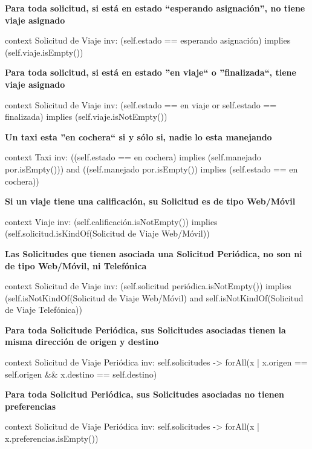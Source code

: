 \documentclass[a4paper, 10pt, twoside]{article}
\newenvironment{ocl}[1]
  {
    \textbf{#1}
    \verbatim
  }{
    \endverbatim
  }
\begin{document}
\begin{ocl}{Para toda solicitud, si está en estado ``esperando asignación'', no tiene viaje asignado}
  context Solicitud de Viaje
  inv: (self.estado == esperando asignación) implies
       (self.viaje.isEmpty()) 
\end{ocl}

\begin{ocl}{Para toda solicitud, si está en estado ''en viaje`` o ''finalizada``, tiene viaje asignado}
  context Solicitud de Viaje
  inv: (self.estado == en viaje or self.estado == finalizada) implies
       (self.viaje.isNotEmpty()) 
\end{ocl}

\begin{ocl}{Un taxi esta ''en cochera`` si y sólo si, nadie lo esta manejando}
  context Taxi
  inv: ((self.estado == en cochera) implies (self.manejado por.isEmpty())) and
       ((self.manejado por.isEmpty()) implies (self.estado == en cochera))
\end{ocl}
 
\begin{ocl}{Si un viaje tiene una calificación, su Solicitud es de tipo Web/M\'ovil}
  context Viaje
  inv: (self.calificación.isNotEmpty()) implies
       (self.solicitud.isKindOf(Solicitud de Viaje Web/M\'ovil)) 
\end{ocl}
 
\begin{ocl}{Las Solicitudes que tienen asociada una Solicitud Periódica, no son ni de tipo Web/M\'ovil, ni Telef\'onica}
  context Solicitud de Viaje
  inv: (self.solicitud periódica.isNotEmpty()) implies
       (self.isNotKindOf(Solicitud de Viaje Web/M\'ovil) and self.isNotKindOf(Solicitud de Viaje Telefónica)) 
\end{ocl}
 
\begin{ocl}{Para toda Solicitude Periódica, sus Solicitudes asociadas tienen la misma dirección de origen y destino}
  context Solicitud de Viaje Periódica
  inv: self.solicitudes -> forAll(x | x.origen == self.origen && x.destino == self.destino) 
\end{ocl}

\begin{ocl}{Para toda Solicitud Periódica, sus Solicitudes asociadas no tienen preferencias}
 context Solicitud de Viaje Periódica
  inv: self.solicitudes -> forAll(x | x.preferencias.isEmpty())
\end{ocl} %
 
\end{document}
